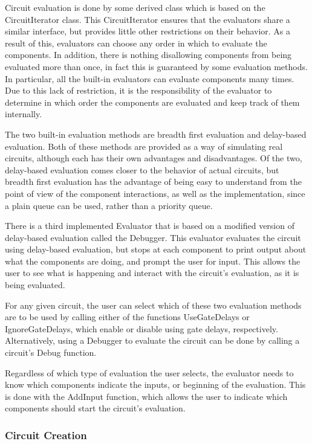 \documentclass{article}
\begin{document}

Circuit evaluation is done by some derived class which is based on the CircuitIterator class. This CircuitIterator ensures that the evaluators share a similar interface, but provides little other restrictions on their behavior. As a result of this, evaluators can choose any order in which to evaluate the components. In addition, there is nothing disallowing components from being evaluated more than once, in fact this is guaranteed by some evaluation methods. In particular, all the built-in evaluators can evaluate components many times. Due to this lack of restriction, it is the responsibility of the evaluator to determine in which order the components are evaluated and keep track of them internally.

The two built-in evaluation methods are breadth first evaluation and delay-based evaluation. Both of these methods are provided as a way of simulating real circuits, although each has their own advantages and disadvantages. Of the two, delay-based evaluation comes closer to the behavior of actual circuits, but breadth first evaluation has the advantage of being easy to understand from the point of view of the component interactions, as well as the implementation, since a plain queue can be used, rather than a priority queue.

There is a third implemented Evaluator that is based on a modified version of delay-based evaluation called the Debugger. This evaluator evaluates the circuit using delay-based evaluation, but stops at each component to print output about what the components are doing, and prompt the user for input. This allows the user to see what is happening and interact with the circuit’s evaluation, as it is being evaluated.

For any given circuit, the user can select which of these two evaluation methods are to be used by calling either of the functions UseGateDelays or IgnoreGateDelays, which enable or disable using gate delays, respectively. Alternatively, using a Debugger to evaluate the circuit can be done by calling a circuit’s Debug function.

Regardless of which type of evaluation the user selects, the evaluator needs to know which components indicate the inputs, or beginning of the evaluation. This is done with the AddInput function, which allows the user to indicate which components should start the circuit’s evaluation.

\subsubsection{Circuit Creation}
\end{document}
